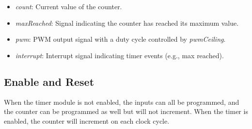 \begin{itemize}[noitemsep]
    \item{\textit{count}: Current value of the counter.}
    \item{\textit{maxReached}: Signal indicating the counter has reached its maximum value.}
    \item{\textit{pwm}: PWM output signal with a duty cycle controlled by \textit{pwmCeiling}.}
    \item{\textit{interrupt}: Interrupt signal indicating timer events (e.g., max reached).}
\end{itemize}

\subsection{Enable and Reset}
When the timer module is not enabled, the inputs can all be programmed,
and the counter can be programmed as well but will not increment.
When the timer is enabled, the counter will increment on each clock cycle.